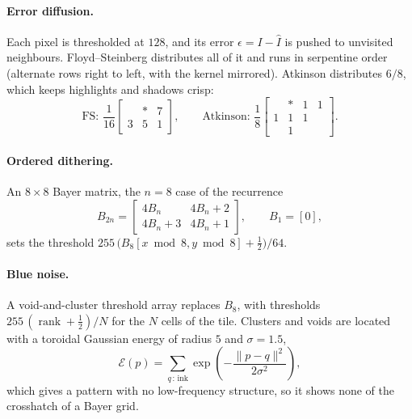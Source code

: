 \documentclass[11pt]{article}
\begin{document}
\paragraph{Error diffusion.} Each pixel is thresholded at $128$, and its error
$\epsilon = I - \hat{I}$ is pushed to unvisited neighbours. Floyd--Steinberg
\cite{floyd} distributes all of it and runs in serpentine order (alternate rows
right to left, with the kernel mirrored). Atkinson distributes $6/8$, which keeps
highlights and shadows crisp:
\begin{equation}
  \text{FS: } \frac{1}{16}\begin{bmatrix} & \ast & 7 \\ 3 & 5 & 1 \end{bmatrix},
  \qquad
  \text{Atkinson: } \frac{1}{8}\begin{bmatrix} & \ast & 1 & 1 \\ 1 & 1 & 1 & \\ & 1 & & \end{bmatrix}.
\end{equation}

\paragraph{Ordered dithering.} An $8 \times 8$ Bayer matrix, the $n = 8$ case of
the recurrence
\begin{equation}
  B_{2n} = \begin{bmatrix} 4B_n & 4B_n + 2 \\ 4B_n + 3 & 4B_n + 1 \end{bmatrix},
  \qquad B_1 = [0],
\end{equation}
sets the threshold $255\,\bigl(B_8[x \bmod 8, y \bmod 8] + \tfrac12\bigr)/64$.

\paragraph{Blue noise.} A void-and-cluster threshold array \cite{ulichney}
replaces $B_8$, with thresholds $255\,(\operatorname{rank} + \tfrac12)/N$ for the
$N$ cells of the tile. Clusters and voids are located with a toroidal Gaussian
energy of radius $5$ and $\sigma = 1.5$,
\begin{equation}
  \mathcal{E}(p) = \sum_{q \,:\, \text{ink}} \exp\!\left(-\frac{\lVert p - q\rVert^2}{2\sigma^2}\right),
\end{equation}
which gives a pattern with no low-frequency structure, so it shows none of the
crosshatch of a Bayer grid.
\end{document}
